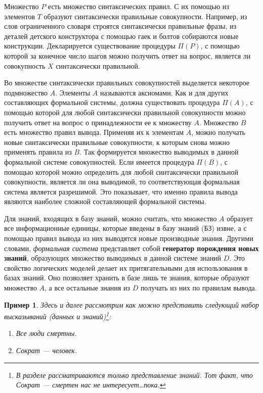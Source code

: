 \documentclass[12pt, openany, twoside]{book} %
\newtheorem{example}{Пример}[chapter]
\begin{document}
Множество $P$ есть множество синтаксических правил. С их помощью из элементов $T$ образуют синтаксически правильные совокупности. Например, из слов ограниченного словаря строятся синтаксически правильные фразы, из деталей детского конструктора с помощью гаек и болтов собираются новые конструкции. Декларируется существование процедуры $\Pi(P)$, с помощью которой за конечное число шагов можно получить ответ на вопрос, является ли совокупность $X$ синтаксически правильной.

Во множестве синтаксически правильных совокупностей выделяется некоторое подмножество $A$. Элементы $A$ называются аксиомами. Как и для других составляющих формальной системы, должна существовать процедура $\Pi(A)$, с помощью которой для любой синтаксически правильной совокупности можно получить ответ на вопрос о принадлежности ее к множеству $A$. Множество $B$ есть множество правил вывода. Применяя их к элементам $A$, можно получать новые синтаксически правильные совокупности, к которым снова можно применять правила из $B$. Так формируется множество выводимых в данной формальной системе совокупностей. Если имеется процедура $\Pi(B)$, с помощью которой можно определить для любой синтаксически правильной совокупности, является ли она выводимой, то соответствующая формальная система является разрешимой. Это показывает, что именно правила вывода являются наиболее сложной составляющей формальной системы.

Для знаний, входящих в базу знаний, можно считать, что множество $A$ образует все информационные единицы, которые введены в базу знаний (БЗ) извне, а с помощью правил вывода из них выводятся новые производные знания. Другими словами, {\em формальная система} представляет собой {\bf генератор порождения новых знаний}, образующих множество выводимых в данной системе знаний $D$. Это свойство логических моделей делает их притягательными для использования в базах знаний. Оно позволяет хранить в базе лишь те знания, которые образуют множество $A$, а все остальные знания из $D$ получать из них по правилам вывода.

\begin{example} Здесь и далее рассмотрим как можно представить следующий набор высказываний (данных и знаний)\footnote{В разделе рассматриваются только представление знаний. Тот факт, что Сократ --- смертен нас не интересует\ldots пока.}:
\label{ex:repr:main}
\begin{enumerate}
\item Все люди смертны.
\item Сократ --- человек.
\end{enumerate}
\end{example}
\end{document}
